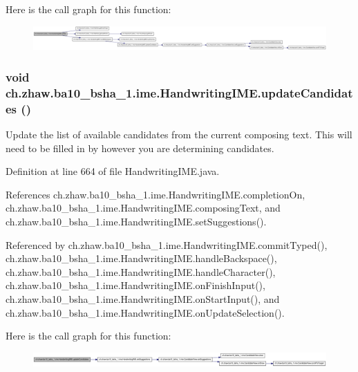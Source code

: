 Here is the call graph for this function:\nopagebreak
\begin{figure}[H]
\begin{center}
\leavevmode
\includegraphics[width=420pt]{classch_1_1zhaw_1_1ba10__bsha__1_1_1ime_1_1HandwritingIME_a788cf4563e1480f6c3ea3ca6f07b2623_cgraph}
\end{center}
\end{figure}
\hypertarget{classch_1_1zhaw_1_1ba10__bsha__1_1_1ime_1_1HandwritingIME_a428fc59e616bef0e75c866ddece97a70}{
\subsubsection[{updateCandidates}]{\setlength{\rightskip}{0pt plus 5cm}void ch.zhaw.ba10\_\-bsha\_\-1.ime.HandwritingIME.updateCandidates ()}}
\label{classch_1_1zhaw_1_1ba10__bsha__1_1_1ime_1_1HandwritingIME_a428fc59e616bef0e75c866ddece97a70}
Update the list of available candidates from the current composing text. This will need to be filled in by however you are determining candidates. 

Definition at line 664 of file HandwritingIME.java.

References ch.zhaw.ba10\_\-bsha\_\-1.ime.HandwritingIME.completionOn, ch.zhaw.ba10\_\-bsha\_\-1.ime.HandwritingIME.composingText, and ch.zhaw.ba10\_\-bsha\_\-1.ime.HandwritingIME.setSuggestions().

Referenced by ch.zhaw.ba10\_\-bsha\_\-1.ime.HandwritingIME.commitTyped(), ch.zhaw.ba10\_\-bsha\_\-1.ime.HandwritingIME.handleBackspace(), ch.zhaw.ba10\_\-bsha\_\-1.ime.HandwritingIME.handleCharacter(), ch.zhaw.ba10\_\-bsha\_\-1.ime.HandwritingIME.onFinishInput(), ch.zhaw.ba10\_\-bsha\_\-1.ime.HandwritingIME.onStartInput(), and ch.zhaw.ba10\_\-bsha\_\-1.ime.HandwritingIME.onUpdateSelection().

Here is the call graph for this function:\nopagebreak
\begin{figure}[H]
\begin{center}
\leavevmode
\includegraphics[width=420pt]{classch_1_1zhaw_1_1ba10__bsha__1_1_1ime_1_1HandwritingIME_a428fc59e616bef0e75c866ddece97a70_cgraph}
\end{center}
\end{figure}


